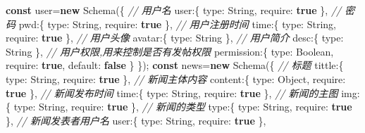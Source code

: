 \documentclass[]{article}
\newenvironment{Shaded}{}{}
\newcommand{\AttributeTok}[1]{\textcolor[rgb]{0.49,0.56,0.16}{#1}}
\newcommand{\CommentTok}[1]{\textcolor[rgb]{0.38,0.63,0.69}{\textit{#1}}}
\newcommand{\DataTypeTok}[1]{\textcolor[rgb]{0.56,0.13,0.00}{#1}}
\newcommand{\KeywordTok}[1]{\textcolor[rgb]{0.00,0.44,0.13}{\textbf{#1}}}
\newcommand{\NormalTok}[1]{#1}
\newcommand{\OperatorTok}[1]{\textcolor[rgb]{0.40,0.40,0.40}{#1}}
\begin{document}
\begin{Shaded}
\begin{Highlighting}[]
\KeywordTok{const}\NormalTok{ user}\OperatorTok{=}\KeywordTok{new} \AttributeTok{Schema}\NormalTok{(}\OperatorTok{\{}
  \CommentTok{// 用户名}
  \DataTypeTok{user}\OperatorTok{:\{}
    \DataTypeTok{type}\OperatorTok{:}\NormalTok{ String}\OperatorTok{,}
    \DataTypeTok{require}\OperatorTok{:} \KeywordTok{true}
  \OperatorTok{\},}
  \CommentTok{// 密码}
  \DataTypeTok{pwd}\OperatorTok{:\{}
    \DataTypeTok{type}\OperatorTok{:}\NormalTok{ String}\OperatorTok{,}
    \DataTypeTok{require}\OperatorTok{:} \KeywordTok{true}
  \OperatorTok{\},}
  \CommentTok{// 用户注册时间}
  \DataTypeTok{time}\OperatorTok{:\{}
    \DataTypeTok{type}\OperatorTok{:}\NormalTok{ String}\OperatorTok{,}
    \DataTypeTok{require}\OperatorTok{:} \KeywordTok{true}
  \OperatorTok{\},}
  \CommentTok{// 用户头像}
  \DataTypeTok{avatar}\OperatorTok{:\{}
    \DataTypeTok{type}\OperatorTok{:}\NormalTok{ String}
  \OperatorTok{\},}
  \CommentTok{// 用户简介}
  \DataTypeTok{desc}\OperatorTok{:\{}
    \DataTypeTok{type}\OperatorTok{:}\NormalTok{ String}
  \OperatorTok{\},}
  \CommentTok{// 用户权限,用来控制是否有发帖权限}
  \DataTypeTok{permission}\OperatorTok{:\{}
    \DataTypeTok{type}\OperatorTok{:}\NormalTok{ Boolean}\OperatorTok{,}
    \DataTypeTok{require}\OperatorTok{:} \KeywordTok{true}\OperatorTok{,}
    \DataTypeTok{default}\OperatorTok{:} \KeywordTok{false}
  \OperatorTok{\}}
\OperatorTok{\}}\NormalTok{)}\OperatorTok{;}
\KeywordTok{const}\NormalTok{ news}\OperatorTok{=}\KeywordTok{new} \AttributeTok{Schema}\NormalTok{(}\OperatorTok{\{}
  \CommentTok{// 标题}
  \DataTypeTok{tittle}\OperatorTok{:\{}
    \DataTypeTok{type}\OperatorTok{:}\NormalTok{ String}\OperatorTok{,}
    \DataTypeTok{require}\OperatorTok{:} \KeywordTok{true}
  \OperatorTok{\},}
  \CommentTok{// 新闻主体内容}
  \DataTypeTok{content}\OperatorTok{:\{}
    \DataTypeTok{type}\OperatorTok{:}\NormalTok{ Object}\OperatorTok{,}
    \DataTypeTok{require}\OperatorTok{:} \KeywordTok{true}
  \OperatorTok{\},}
  \CommentTok{// 新闻发布时间}
  \DataTypeTok{time}\OperatorTok{:\{}
    \DataTypeTok{type}\OperatorTok{:}\NormalTok{ String}\OperatorTok{,}
    \DataTypeTok{require}\OperatorTok{:} \KeywordTok{true}
  \OperatorTok{\},}
  \CommentTok{// 新闻的主图}
  \DataTypeTok{img}\OperatorTok{:\{}
    \DataTypeTok{type}\OperatorTok{:}\NormalTok{ String}\OperatorTok{,}
    \DataTypeTok{require}\OperatorTok{:} \KeywordTok{true}
  \OperatorTok{\},}
  \CommentTok{// 新闻的类型}
  \DataTypeTok{type}\OperatorTok{:\{}
    \DataTypeTok{type}\OperatorTok{:}\NormalTok{ String}\OperatorTok{,}
    \DataTypeTok{require}\OperatorTok{:} \KeywordTok{true}
  \OperatorTok{\},}
  \CommentTok{// 新闻发表者用户名}
  \DataTypeTok{user}\OperatorTok{:\{}
    \DataTypeTok{type}\OperatorTok{:}\NormalTok{ String}\OperatorTok{,}
    \DataTypeTok{require}\OperatorTok{:} \KeywordTok{true}
  \OperatorTok{\},}
  

\end{Highlighting}
\end{Shaded}
\end{document}
